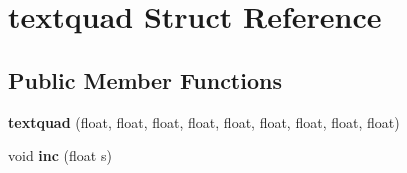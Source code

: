 \hypertarget{structtextquad}{\section{textquad Struct Reference}
\label{structtextquad}
}
\subsection*{Public Member Functions}
\begin{DoxyCompactItemize}
\item 
\hypertarget{structtextquad_af57e4b44cc03271bfa6659492f2efc5f}{{\bfseries textquad} (float, float, float, float, float, float, float, float, float)}\label{structtextquad_af57e4b44cc03271bfa6659492f2efc5f}

\item 
\hypertarget{structtextquad_ae7d7ccac9ee4c8cab9bbfb75bdf84985}{void {\bfseries inc} (float s)}\label{structtextquad_ae7d7ccac9ee4c8cab9bbfb75bdf84985}

\end{DoxyCompactItemize}

